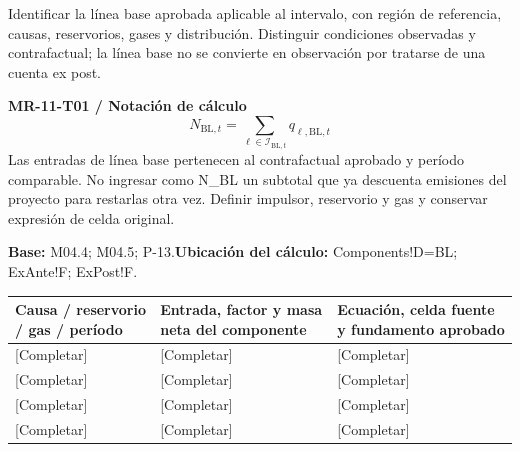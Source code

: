 Identificar la línea base aprobada aplicable al intervalo, con región de referencia, causas, reservorios, gases y distribución. Distinguir condiciones observadas y contrafactual; la línea base no se convierte en observación por tratarse de una cuenta ex post.\par
{}
\par\begingroup\sffamily\fontsize{8.4}{10.5}\selectfont\color{NEBGreen}
\textbf{MR-11-T01 / Notación de cálculo}\
{\fontsize{10}{12}\selectfont\[N_{\mathrm{BL},t}=\sum_{\ell\in\mathcal I_{\mathrm{BL},t}}q_{\ell,\mathrm{BL},t}\]}
Las entradas de línea base pertenecen al contrafactual aprobado y período comparable. No ingresar como N\_BL un subtotal que ya descuenta emisiones del proyecto para restarlas otra vez. Definir impulsor, reservorio y gas y conservar expresión de celda original.\par
\textbf{Base:} M04.4; M04.5; P-13.\quad\textbf{Ubicación del cálculo:} Components!D=BL; ExAnte!F; ExPost!F.\par\endgroup
{\sffamily\fontsize{8.6}{10.7}\selectfont\begin{longtable}{@{}P{48mm}P{61mm}P{53mm}@{}}
\toprule
\textbf{Causa / reservorio / gas / período} & \textbf{Entrada, factor y masa neta del componente} & \textbf{Ecuación, celda fuente y fundamento aprobado}\\\midrule\endhead
\rule{0pt}{8mm}[Completar] & [Completar] & [Completar]\\\hline
\rule{0pt}{8mm}[Completar] & [Completar] & [Completar]\\\hline
\rule{0pt}{8mm}[Completar] & [Completar] & [Completar]\\\hline
\rule{0pt}{8mm}[Completar] & [Completar] & [Completar]\\\hline
\end{longtable}}
